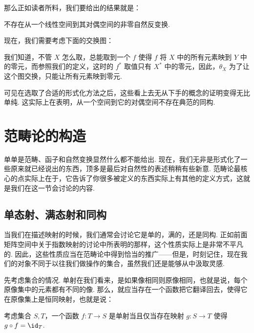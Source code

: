 那么正如读者所料，我们要给出的结果就是：

\begin{example}{}{}
    不存在从一个线性空间到其对偶空间的非零自然反变换.

    现在，我们需要考虑下面的交换图：

    \begin{center}
    \end{center}

    我们知道，不管 $X$ 怎么取，总能取到一个 $f$ 使得 $f$ 将 $X$ 中的所有元素映到 $Y$ 中的零元，而参照我们的定义，这时的 $f^*$ 取值只有 $X^*$ 中的零元，因此，$\theta_X$ 为了让这个图交换，只能让所有元素映到零元.
\end{example}

可见在选取了合适的形式化方法之后，这些看上去无从下手的概念的证明变得无比单纯. 这实际上在表明，从一个空间到它的对偶空间不存在典范的同构.

\section{范畴论的构造}

单单是范畴、函子和自然变换显然什么都不能给出. 现在，我们无非是形式化了一些原来就已经说出的东西，顶多是最后对自然性的表述稍稍有些新意. 范畴论最核心的点实际上在于，它告诉了你很多被定义的东西实际上有其他的定义方式，这就是我们在这一节会讨论的内容.

\subsection{单态射、满态射和同构}

当我们在描述映射的时候，我们通常会讨论它是单的，满的，还是同构. 正如前面矩阵空间中关于指数映射的讨论中所表明的那样，这个性质实际上是非常不平凡的. 因此，这些性质应当在范畴论中得到恰当的推广——但是，时刻记住，现在我们的对象不同于以往我们做操作的集合，虽然我们还是能够从中汲取灵感.

先考虑集合的情况. 单射在我们看来，是如果像相同则原像相同，也就是说，每个原像集中的元素都有不同的像. 那么，就应当存在一个函数把它翻译回去，使得它在原像集上是恒同映射，也就是说：

\begin{lemma}{}{}
    考虑集合 $S, T$，一个函数 $f\colon T \to S$ 是单射当且仅当存在映射 $g\colon S \to T$ 使得 $g \circ f = \id_T$.
\end{lemma}

